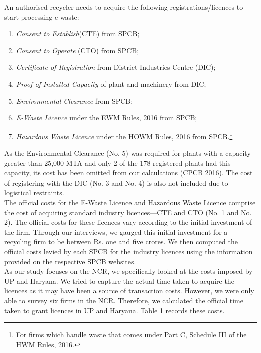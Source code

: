 \documentclass[a4paper, 12pt]{article}
\begin{document}
                    An authorised recycler needs to acquire the following registrations/licences to start processing e-waste:                  
                    \begin{enumerate}
                      \item \textit{Consent to Establish}(CTE) from SPCB;
                      \item \textit{Consent to Operate} (CTO) from SPCB;
                      \item \textit{Certificate of Registration} from District Industries Centre (DIC);
                      \item \textit{Proof of Installed Capacity} of plant and machinery from DIC;
                      \item \textit{Environmental Clearance} from SPCB; 
                      \item \textit{E-Waste Licence} under the EWM Rules, 2016 from SPCB;
                      \item \textit{Hazardous Waste Licence} under the HOWM Rules, 2016 from SPCB.\footnote{For firms which handle waste that comes under Part C, Schedule III of the HWM Rules, 2016.} 
                    \end{enumerate}
                    
                    As the Environmental Clearance (No. 5) was required for plants with a capacity greater than 25,000 MTA and only 2 of the 178 registered plants had this capacity, its cost has been omitted from our calculations (CPCB 2016). The cost of registering with the DIC (No. 3 and No. 4) is also not included due to logistical restraints.\\
                    
                    The official costs for the E-Waste Licence and Hazardous Waste Licence comprise the cost of acquiring standard industry licences—CTE and CTO (No. 1 and No. 2). The official costs for these licences vary according to the initial investment of the firm. Through our interviews, we gauged this initial investment for a recycling firm to be between Rs. one and five crores. We then computed the official costs levied by each SPCB for the industry licences using the information provided on the respective SPCB websites.\\ 
                    
                    As our study focuses on the NCR, we specifically looked at the costs imposed by UP and Haryana. We tried to capture the actual time taken to acquire the licences as it may have been a source of transaction costs. However, we were only able to survey six firms in the NCR. Therefore, we calculated the official time taken to grant licences in UP and Haryana. Table 1 records these costs. \\
          
\end{document}

